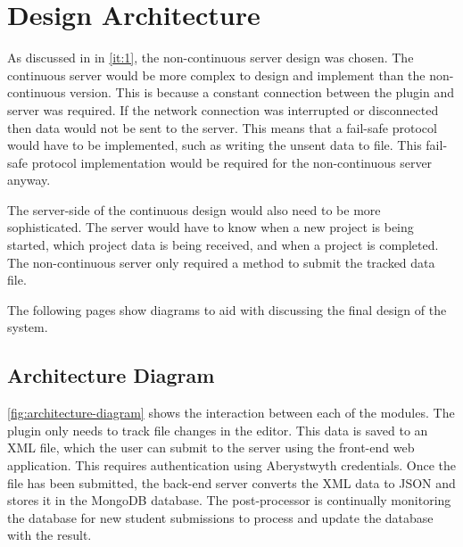 \chapter{Design Architecture}
\label{chp:design}
As discussed in  in \autoref{it:1}, the non-continuous server design was chosen. The continuous server would be more complex to design and implement than the non-continuous version. This is because a constant connection between the plugin and server was required. If the network connection was interrupted or disconnected then data would not be sent to the server. This means that a fail-safe protocol would have to be implemented, such as writing the unsent data to file. This fail-safe protocol implementation would be required for the non-continuous server anyway.

The server-side of the continuous design would also need to be more sophisticated. The server would have to know when a new project is being started, which project data is being received, and when a project is completed. The non-continuous server only required a method to submit the tracked data file.

The following pages show diagrams to aid with discussing the final design of the system.

\newpage

\section{Architecture Diagram}
\autoref{fig:architecture-diagram} shows the interaction between each of the modules. The plugin only needs to track file changes in the editor. This data is saved to an XML file, which the user can submit to the server using the front-end web application. This requires authentication using Aberystwyth credentials. Once the file has been submitted, the back-end server converts the XML data to JSON and stores it in the MongoDB database. The post-processor is continually monitoring the database for new student submissions to process and update the database with the result.

\vspace*{\fill}

